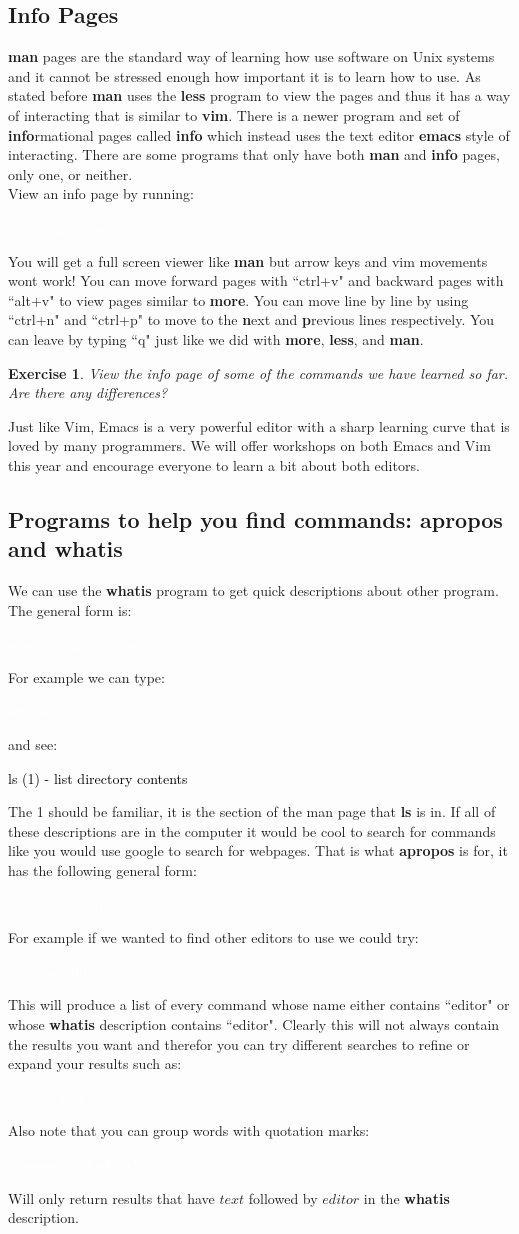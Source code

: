 \documentclass[oneside]{book}
\newcommand{\commandline}[1]{\begin{center} \colorbox{Dark}{\textcolor{white}{#1}} \end{center}}
\newcommand{\exampleout}[1]{\begin{center} \colorbox{Light}{\textcolor{black}{#1}} \end{center}}
\newtheorem{ex}{Exercise}[chapter]
\begin{document}
\subsection{Info Pages}
\textbf{man} pages are the standard way of learning how use software on Unix systems and it cannot be stressed enough how important it is to learn how to use. As stated before \textbf{man} uses the \textbf{less} program to view the pages and thus it has a way of interacting that is similar to \textbf{vim}. There is a newer program and set of \textbf{info}rmational pages called \textbf{info} which instead uses the text editor \textbf{emacs} style of interacting. There are some programs that only have both \textbf{man} and \textbf{info} pages, only one, or neither. \\
View an info page by running:
\commandline{info programname}
You will get a full screen viewer like \textbf{man} but arrow keys and vim movements wont work! You can move forward pages with ``ctrl+v" and backward pages with ``alt+v" to view pages similar to \textbf{more}. You can move line by line by using ``ctrl+n" and ``ctrl+p" to move to the \textbf{n}ext and \textbf{p}revious lines respectively. You can leave by typing ``q" just like we did with \textbf{more}, \textbf{less}, and \textbf{man}. \\
\begin{ex}
	View the info page of some of the commands we have learned so far. Are there any differences? 
\end{ex}
Just like Vim, Emacs is a very powerful editor with a sharp learning curve that is loved by many programmers. We will offer workshops on both Emacs and Vim this year and encourage everyone to learn a bit about both editors. 

\subsection{Programs to help you find commands: \textbf{apropos} and \textbf{whatis}}
We can use the \textbf{whatis} program to get quick descriptions about other program. The general form is:
\commandline{whatis programname}
For example we can type:
\commandline{whatis ls}
and see:
\exampleout{ls (1)		- list directory contents}
The 1 should be familiar, it is the section of the man page that \textbf{ls} is in. If all of these descriptions are in the computer it would be cool to search for commands like you would use google to search for webpages.
That is what \textbf{apropos} is for, it has the following general form:
\commandline{apropos whatToSearchFor}
For example if we wanted to find other editors to use we could try:
\commandline{apropos editor}
This will produce a list of every command whose name either contains ``editor" or whose \textbf{whatis} description contains ``editor". Clearly this will not always contain the results you want and therefor you can try different searches to refine or expand your results such as:
\commandline{apropos text editor}
Also note that you can group words with quotation marks:
\commandline{apropos ``text editor"} 
Will only return results that have $text$ followed by $editor$ in the \textbf{whatis} description.
\end{document}
